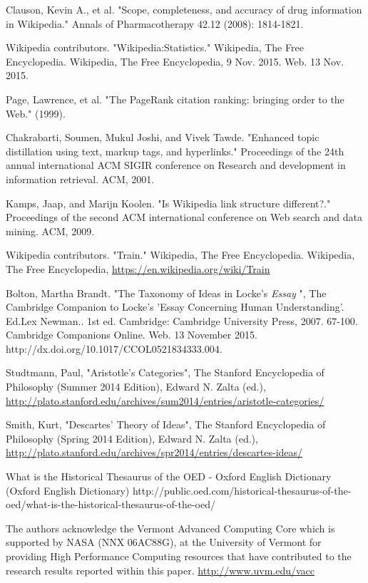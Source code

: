 \documentclass[pre,twocolumn,twoside,superscriptaddress,floatfix, aps, 10pt]{revtex4-1}
\begin{document}
\begin{thebibliography}{1}
       Clauson, Kevin A., et al. "Scope, completeness, and accuracy of drug information in Wikipedia." Annals of Pharmacotherapy 42.12 (2008): 1814-1821.

       Wikipedia contributors. "Wikipedia:Statistics." Wikipedia, The Free Encyclopedia. Wikipedia, The Free Encyclopedia, 9 Nov. 2015. Web. 13 Nov. 2015.

       Page, Lawrence, et al. "The PageRank citation ranking: bringing order to the Web." (1999).

       Chakrabarti, Soumen, Mukul Joshi, and Vivek Tawde. "Enhanced topic distillation using text, markup tags, and hyperlinks." Proceedings of the 24th annual international ACM SIGIR conference on Research and development in information retrieval. ACM, 2001.

       Kamps, Jaap, and Marijn Koolen. "Is Wikipedia link structure different?." Proceedings of the second ACM international conference on Web search and data mining. ACM, 2009.
          
       Wikipedia contributors. "Train." Wikipedia, The Free Encyclopedia. Wikipedia, The Free Encyclopedia, 
          \url{https://en.wikipedia.org/wiki/Train}

     Bolton, Martha Brandt. "The Taxonomy of Ideas in Locke’s {\it Essay} ", The Cambridge Companion to Locke's 'Essay Concerning Human Understanding'. Ed.Lex Newman.. 1st ed. Cambridge: Cambridge University Press, 2007. 67-100. Cambridge Companions Online. Web. 13 November 2015. http://dx.doi.org/10.1017/CCOL0521834333.004.

     Studtmann, Paul, "Aristotle's Categories", The Stanford Encyclopedia of Philosophy (Summer 2014 Edition), Edward N. Zalta (ed.), \url{http://plato.stanford.edu/archives/sum2014/entries/aristotle-categories/}

     Smith, Kurt, "Descartes' Theory of Ideas", The Stanford Encyclopedia of Philosophy (Spring 2014 Edition), Edward N. Zalta (ed.), \url{http://plato.stanford.edu/archives/spr2014/entries/descartes-ideas/}


     What is the Historical Thesaurus of the OED - Oxford English Dictionary (Oxford English Dictionary)
    http://public.oed.com/historical-thesaurus-of-the-oed/what-is-the-historical-thesaurus-of-the-oed/

     The authors acknowledge the Vermont Advanced Computing Core which is supported by NASA (NNX 06AC88G), at the University of Vermont for providing High Performance Computing resources that have contributed to the research results reported within this paper.
    \url{http://www.uvm.edu/vacc}


\end{thebibliography}
\end{document}
